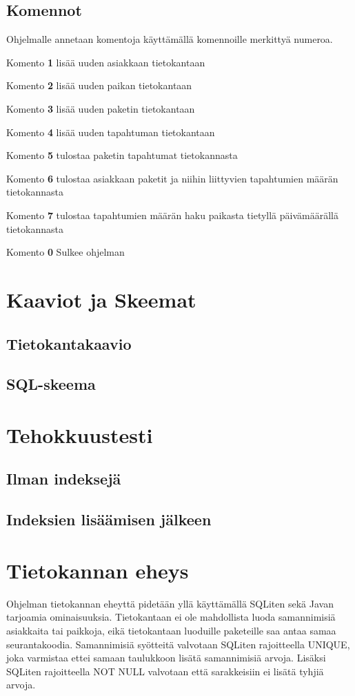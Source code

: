 \documentclass[11pt,a4paper]{article}
\begin{document}
\subsection*{Komennot}
Ohjelmalle annetaan komentoja käyttämällä komennoille merkittyä numeroa.
\begin{description}
\item Komento \textbf{1} lisää uuden asiakkaan tietokantaan
\item Komento \textbf{2} lisää uuden paikan tietokantaan
\item Komento \textbf{3} lisää uuden paketin tietokantaan
\item Komento \textbf{4} lisää uuden tapahtuman tietokantaan
\item Komento \textbf{5} tulostaa paketin tapahtumat tietokannasta
\item Komento \textbf{6} tulostaa asiakkaan paketit ja niihin liittyvien tapahtumien määrän tietokannasta
\item Komento \textbf{7} tulostaa tapahtumien määrän haku paikasta tietyllä päivämäärällä tietokannasta
\item Komento \textbf{0} Sulkee ohjelman 
\end{description}

\newpage
\section{Kaaviot ja Skeemat}
\subsection*{Tietokantakaavio}

\subsection*{SQL-skeema}

\newpage
\section{Tehokkuustesti}
\subsection*{Ilman indeksejä}
\subsection*{Indeksien lisäämisen jälkeen}

\newpage
\section{Tietokannan eheys}
Ohjelman tietokannan eheyttä pidetään yllä käyttämällä SQLiten sekä Javan tarjoamia ominaisuuksia.
Tietokantaan ei ole mahdollista luoda samannimisiä asiakkaita tai paikkoja, eikä tietokantaan luoduille paketeille saa antaa samaa seurantakoodia. Samannimisiä syötteitä valvotaan SQLiten rajoitteella UNIQUE, joka varmistaa ettei samaan taulukkoon lisätä samannimisiä arvoja. Lisäksi SQLiten rajoitteella NOT NULL valvotaan että sarakkeisiin ei lisätä tyhjiä arvoja.
 
\end{document}
